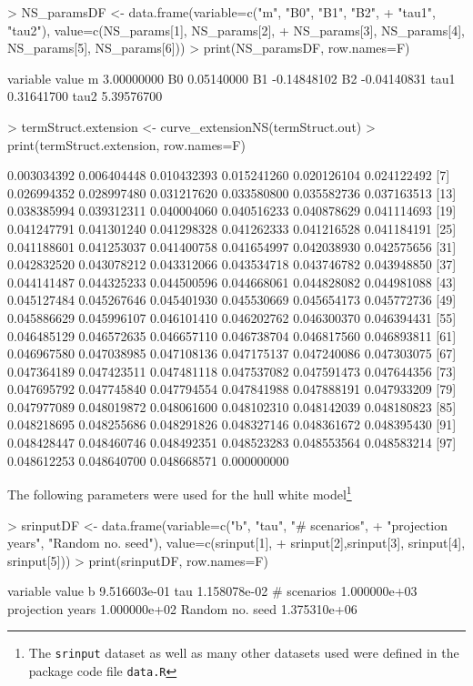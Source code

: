 \documentclass[12pt]{article}
\begin{document}
\begin{Schunk}
\begin{Sinput}
> NS_paramsDF <- data.frame(variable=c("m", "B0", "B1", "B2",
+   "tau1", "tau2"), value=c(NS_params[1], NS_params[2], 
+   NS_params[3], NS_params[4], NS_params[5], NS_params[6]))
> print(NS_paramsDF, row.names=F)
\end{Sinput}
\begin{Soutput}
 variable       value
        m  3.00000000
       B0  0.05140000
       B1 -0.14848102
       B2 -0.04140831
     tau1  0.31641700
     tau2  5.39576700
\end{Soutput}
\begin{Sinput}
> termStruct.extension <- curve_extensionNS(termStruct.out)
> print(termStruct.extension, row.names=F)
\end{Sinput}
\begin{Soutput}
  [1] 0.003034392 0.006404448 0.010432393 0.015241260 0.020126104 0.024122492
  [7] 0.026994352 0.028997480 0.031217620 0.033580800 0.035582736 0.037163513
 [13] 0.038385994 0.039312311 0.040004060 0.040516233 0.040878629 0.041114693
 [19] 0.041247791 0.041301240 0.041298328 0.041262333 0.041216528 0.041184191
 [25] 0.041188601 0.041253037 0.041400758 0.041654997 0.042038930 0.042575656
 [31] 0.042832520 0.043078212 0.043312066 0.043534718 0.043746782 0.043948850
 [37] 0.044141487 0.044325233 0.044500596 0.044668061 0.044828082 0.044981088
 [43] 0.045127484 0.045267646 0.045401930 0.045530669 0.045654173 0.045772736
 [49] 0.045886629 0.045996107 0.046101410 0.046202762 0.046300370 0.046394431
 [55] 0.046485129 0.046572635 0.046657110 0.046738704 0.046817560 0.046893811
 [61] 0.046967580 0.047038985 0.047108136 0.047175137 0.047240086 0.047303075
 [67] 0.047364189 0.047423511 0.047481118 0.047537082 0.047591473 0.047644356
 [73] 0.047695792 0.047745840 0.047794554 0.047841988 0.047888191 0.047933209
 [79] 0.047977089 0.048019872 0.048061600 0.048102310 0.048142039 0.048180823
 [85] 0.048218695 0.048255686 0.048291826 0.048327146 0.048361672 0.048395430
 [91] 0.048428447 0.048460746 0.048492351 0.048523283 0.048553564 0.048583214
 [97] 0.048612253 0.048640700 0.048668571 0.000000000
\end{Soutput}
\end{Schunk}

The following parameters were used for the hull white model\footnote{The \texttt{srinput} 
dataset as well as many other datasets used were defined in the package code file 
\texttt{data.R}}

\begin{Schunk}
\begin{Sinput}
> srinputDF <- data.frame(variable=c("b", "tau", "# scenarios", 
+   "projection years",  "Random no. seed"), value=c(srinput[1], 
+   srinput[2],srinput[3], srinput[4], srinput[5]))
> print(srinputDF, row.names=F)
\end{Sinput}
\begin{Soutput}
         variable        value
                b 9.516603e-01
              tau 1.158078e-02
      # scenarios 1.000000e+03
 projection years 1.000000e+02
  Random no. seed 1.375310e+06
\end{Soutput}
\end{Schunk}
\end{document}
